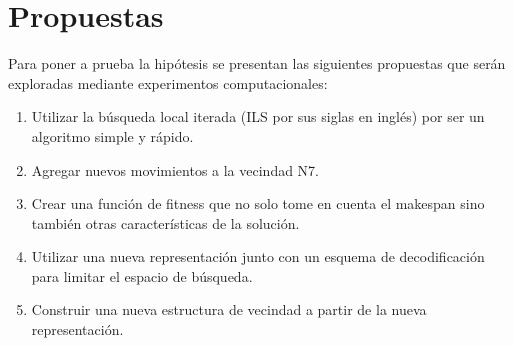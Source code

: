 \section{Propuestas}
Para poner a prueba la hipótesis se presentan las siguientes propuestas que serán exploradas mediante experimentos computacionales:
\begin{enumerate}
\item Utilizar la búsqueda local iterada (ILS por sus siglas en inglés) por ser un algoritmo simple y rápido.
\item Agregar nuevos movimientos a la vecindad N7.
\item Crear una función de fitness que no solo tome en  cuenta el makespan sino también otras características de la solución.
\item Utilizar una nueva representación junto con un esquema de decodificación para limitar el espacio de búsqueda.
\item Construir una nueva estructura de vecindad a partir de la nueva representación.
\end{enumerate}
